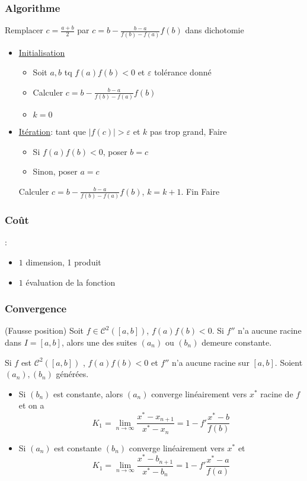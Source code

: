 \subsubsection*{Algorithme}
Remplacer $c = \frac{a + b}{2}$ par $c = b - \frac{b - a}{f(b) - f(a)}f(b)$ dans dichotomie
\begin{itemize}
    \item \underline{Initialisation}
        \begin{itemize}
            \item Soit $a, b$ tq  $f(a)f(b) < 0$ et  $\varepsilon$ tolérance donné
            \item Calculer  $c = b - \frac{b - a}{f(b) - f(a)}f(b)$ 
            \item $k = 0$
        \end{itemize}
    \item \underline{Itération}: tant que $|f(c)| > \varepsilon$ et  $k$ pas trop grand, Faire
         \begin{itemize}
            \item Si $f(a)f(b) < 0$,  poser  $b = c$
            \item Sinon, poser  $a = c$
        \end{itemize}
        Calculer $c = b - \frac{b - a}{f(b) - f(a)}f(b)$, $k = k+1$. Fin Faire
\end{itemize}
\subsubsection*{Coût}:
\begin{itemize}
    \item $1$ dimension, 1 produit
    \item  $1$ évaluation de la fonction
\end{itemize}

\subsubsection*{Convergence} (Fausse position)
Soit $f \in  \mathcal{C}^2([a, b])$, $f(a)f(b) < 0$. Si $f''$ n'a aucune racine dans  $I = [a, b]$, alors une des suites  $(a_n)$ ou $(b_n)$ demeure constante.

 \begin{prop}
     Si $f$ est  $\mathcal{C}^2([a, b])$ , $f(a)f(b) < 0$ et  $f''$ n'a aucune racine sur  $[a, b]$. Soient  $(a_n), (b_n)$ générées.
      \begin{itemize}
         \item Si $(b_n)$ est constante, alors  $(a_n)$ converge linéairement vers  $x^*$ racine de  $f$ et on a 
              \[
             K_1 = \lim_{n \to \infty} \frac{x^* - x_{n+1}}{x^* - x_n} = 1 - f'\frac{x^* - b}{f(b)}
             \] 
            \item Si $(a_n)$ est constante  $(b_n)$ converge linéairement vers  $x^*$ et 
                 \[
             K_1 = \lim_{n \to \infty} \frac{x^* - b_{n+1}}{x^* - b_n} = 1 - f'\frac{x^* - a}{f(a)}
                \] 
     \end{itemize}
\end{prop}
